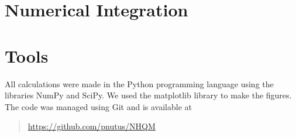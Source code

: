 \documentclass[12pt,a4paper]{report}
\begin{document}




\chapter{Numerical Integration}



\chapter{Tools}

All calculations were made in the Python programming language 
using the libraries NumPy and SciPy. We used the matplotlib 
library to make the figures. The code was managed using Git 
and is available at
\begin{quote}
  \url{https://github.com/pnutus/NHQM}
\end{quote}



\end{document}
